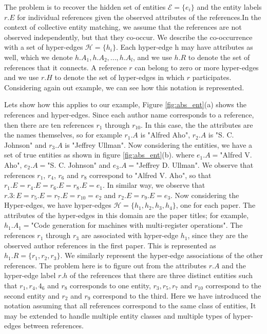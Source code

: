  The problem is to recover the hidden set of entities $\mathcal{E} = \{e_i\}$ and the entity labels $r.E$ for individual references given the observed attributes of the references.In the context of collective entity matching, we assume that the references are not observed independently, but that they co-occur. We describe the co-occurrence with a set of hyper-edges $\mathcal{H} =\{h_i\}$. Each hyper-edge h may have attributes as well, which we denote $h.A_1,h.A_2,...,h.A_l$, and we use $h.R$ to denote the set of references that it connects. A reference $r$ can belong to zero or more hyper-edges and we use $r.H$ to denote the set of hyper-edges in which $r$ participates. Considering again out example, we can see how this notation is represented.

Lets show how this applies to our example, Figure \ref{fig:abs_ent}(a) shows the references and hyper-edges. Since each author name corresponds to a reference, then there are ten references $r_1$ through $r_{10}$. In this case, the the attributes are the names themselves, so for example $r_1.A$ is "Alfred Aho", $r_2.A$ is "S. C. Johnson" and $r_3.A$ is "Jeffrey Ullman". Now considering the entities, we have a set of true entities as shown in figure \ref{fig:abs_ent}(b). where $e_1.A=$"Alfred V. Aho", $e_2.A=$"S. C. Johnson" and $e_3.A=$"Jeffrey D. Ullman". We observe that references $r_1$, $r_4$, $r_6$ and $r_8$ correspond to "Alfred V. Aho", so that $r_1.E = r_4.E = r_6.E = r_8.E = e_1$. In similar way, we observe that $r.3:E = r_5.E = r_7.E = r_10 = e_2$ and $r_2.E = r_9.E = e_3$. 
Now considering the Hyper-edges, we have hyper-edges $\mathcal{H} = \{h_1,h_2,h_3,h_4\}$, one for each paper. The attributes of  the hyper-edges in this domain are the paper titles; for example, $h_1.A_1=$"Code generation for machines with multi-register operations". The references $r_1$ through $r_3$ are associated with hyper-edge $h_1$, since they are the observed author references in the first paper. This is represented as $h_1.R = \{r_1,r_2,r_3\}$. We similarly represent the hyper-edge associations of the other references. The problem here is to figure out from the attributes $r.A$ and the hyper-edge label $r.h$ of the references that there are three distinct entities such that $r_1,r_4,4_6$ and $r_8$ corresponds to one entity, $r_3,r_5,r_7$ and $r_10$ correspond to the second entity and $r_2$ and $r_9$ correspond to the third. Here we have introduced the notation assuming that all references correspond to the same class of entities, It may be extended to handle multiple entity classes and multiple types of hyper-edges between references.

